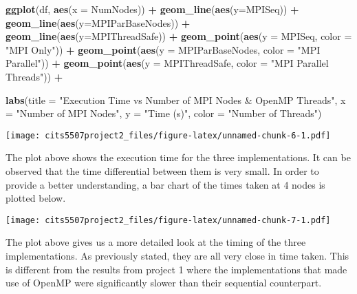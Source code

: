 \documentclass[
]{article}
\newenvironment{Shaded}{\begin{snugshade}}{\end{snugshade}}
\newcommand{\AttributeTok}[1]{\textcolor[rgb]{0.13,0.29,0.53}{#1}}
\newcommand{\FunctionTok}[1]{\textcolor[rgb]{0.13,0.29,0.53}{\textbf{#1}}}
\newcommand{\NormalTok}[1]{#1}
\newcommand{\SpecialCharTok}[1]{\textcolor[rgb]{0.81,0.36,0.00}{\textbf{#1}}}
\newcommand{\StringTok}[1]{\textcolor[rgb]{0.31,0.60,0.02}{#1}}
\begin{document}
\begin{Shaded}
\begin{Highlighting}[]
\FunctionTok{ggplot}\NormalTok{(df,  }\FunctionTok{aes}\NormalTok{(}\AttributeTok{x =}\NormalTok{ NumNodes)) }\SpecialCharTok{+}
  \FunctionTok{geom\_line}\NormalTok{(}\FunctionTok{aes}\NormalTok{(}\AttributeTok{y=}\NormalTok{MPISeq)) }\SpecialCharTok{+}
  \FunctionTok{geom\_line}\NormalTok{(}\FunctionTok{aes}\NormalTok{(}\AttributeTok{y=}\NormalTok{MPIParBaseNodes)) }\SpecialCharTok{+}
  \FunctionTok{geom\_line}\NormalTok{(}\FunctionTok{aes}\NormalTok{(}\AttributeTok{y=}\NormalTok{MPIThreadSafe)) }\SpecialCharTok{+}
  \FunctionTok{geom\_point}\NormalTok{(}\FunctionTok{aes}\NormalTok{(}\AttributeTok{y =}\NormalTok{ MPISeq, }\AttributeTok{color =} \StringTok{"MPI Only"}\NormalTok{)) }\SpecialCharTok{+}
  \FunctionTok{geom\_point}\NormalTok{(}\FunctionTok{aes}\NormalTok{(}\AttributeTok{y =}\NormalTok{ MPIParBaseNodes, }\AttributeTok{color =} \StringTok{"MPI Parallel"}\NormalTok{)) }\SpecialCharTok{+}
  \FunctionTok{geom\_point}\NormalTok{(}\FunctionTok{aes}\NormalTok{(}\AttributeTok{y =}\NormalTok{ MPIThreadSafe, }\AttributeTok{color =} \StringTok{"MPI Parallel Threads"}\NormalTok{)) }\SpecialCharTok{+}
  
  \FunctionTok{labs}\NormalTok{(}\AttributeTok{title =} \StringTok{"Execution Time vs Number of MPI Nodes \& OpenMP Threads"}\NormalTok{,}
    \AttributeTok{x =} \StringTok{"Number of MPI Nodes"}\NormalTok{,}
    \AttributeTok{y =} \StringTok{"Time (s)"}\NormalTok{,}
    \AttributeTok{color =} \StringTok{"Number of Threads"}\NormalTok{)}
\end{Highlighting}
\end{Shaded}

\texttt{[image: cits5507project2\_files/figure-latex/unnamed-chunk-6-1.pdf]}

The plot above shows the execution time for the three implementations.
It can be observed that the time differential between them is very
small. In order to provide a better understanding, a bar chart of the
times taken at 4 nodes is plotted below.

\texttt{[image: cits5507project2\_files/figure-latex/unnamed-chunk-7-1.pdf]}

The plot above gives us a more detailed look at the timing of the three
implementations. As previously stated, they are all very close in time
taken. This is different from the results from project 1 where the
implementations that made use of OpenMP were significantly slower than
their sequential counterpart.
\end{document}
